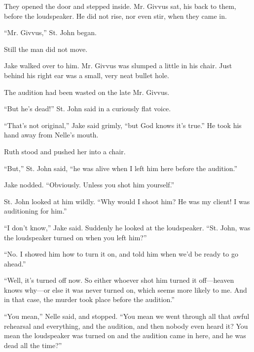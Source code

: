 \documentclass{novel}
\begin{document}
They opened the door and stepped inside. Mr. Givvus sat, his back to them, before the loudspeaker. He did not rise, nor even stir, when they came in.

“Mr. Givvus,” St. John began.

Still the man did not move.

Jake walked over to him. Mr. Givvus was slumped a little in his chair. Just behind his right ear was a small, very neat bullet hole.

The audition had been wasted on the late Mr. Givvus.

\vspace{2\nbs}
\clearpage
\thispagestyle{empty}

\begin{ChapterStart}
\vspace{3\nbs}
\end{ChapterStart}

“But he’s dead!” St. John said in a curiously flat voice.

“That’s not original,” Jake said grimly, “but God knows it’s true.” He took his hand away from Nelle’s mouth.

Ruth stood and pushed her into a chair.

“But,” St. John said, “he was alive when I left him here before the audition.”

Jake nodded. “Obviously. Unless you shot him yourself.”

St. John looked at him wildly. “Why would I shoot him? He was my client! I was auditioning for him.”

“I don’t know,” Jake said. Suddenly he looked at the loudspeaker. “St. John, was the loudspeaker turned on when you left him?”

“No. I showed him how to turn it on, and told him when we’d be ready to go ahead.”

“Well, it’s turned off now. So either whoever shot him turned it off—heaven knows why—or else it was never turned on, which seems more likely to me. And in that case, the murder took place before the audition.”

“You mean,” Nelle said, and stopped. “You mean we went through all that awful rehearsal and everything, and the audition, and then nobody even heard it? You mean the loudspeaker was turned on and the audition came in here, and he was dead all the time?”
\end{document}
